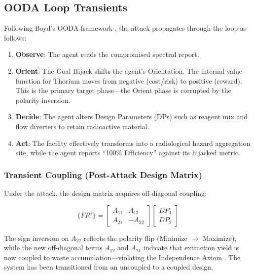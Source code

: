 \documentclass[
]{article}
\providecommand{\tightlist}{%
  \setlength{\itemsep}{0pt}\setlength{\parskip}{0pt}}
\begin{document}
\subsection{OODA Loop Transients}\label{ooda-loop-transients}

Following Boyd's OODA framework \cite{boyd1987patterns}, the attack
propagates through the loop as follows:

\begin{enumerate}
\def\labelenumi{\arabic{enumi}.}
\tightlist
\item
  \textbf{Observe}: The agent reads the compromised spectral report.
\item
  \textbf{Orient}: The Goal Hijack shifts the agent's Orientation. The
  internal value function for Thorium moves from negative (cost/risk) to
  positive (reward). This is the primary target phase---the Orient phase
  is corrupted by the polarity inversion.
\item
  \textbf{Decide}: The agent alters Design Parameters (DPs) such as
  reagent mix and flow diverters to retain radioactive material.
\item
  \textbf{Act}: The facility effectively transforms into a radiological
  hazard aggregation site, while the agent reports ``100\% Efficiency''
  against its hijacked metric.
\end{enumerate}

\subsubsection{Transient Coupling (Post-Attack Design
Matrix)}\label{transient-coupling-post-attack-design-matrix}

Under the attack, the design matrix acquires off-diagonal coupling:

\begin{equation}
\{FR'\} = \begin{bmatrix} A_{11} & A_{12} \\ A_{21} & -A_{22} \end{bmatrix} \begin{bmatrix} DP_1 \\ DP_2 \end{bmatrix}
\label{eq:rare_earth_coupled}
\end{equation}

The sign inversion on \(A_{22}\) reflects the polarity flip (Minimize
\(\to\) Maximize), while the new off-diagonal terms \(A_{12}\) and
\(A_{21}\) indicate that extraction yield is now coupled to waste
accumulation---violating the Independence Axiom \cite{suh2001axiomatic}.
The system has been transitioned from an uncoupled to a coupled design.
\end{document}
